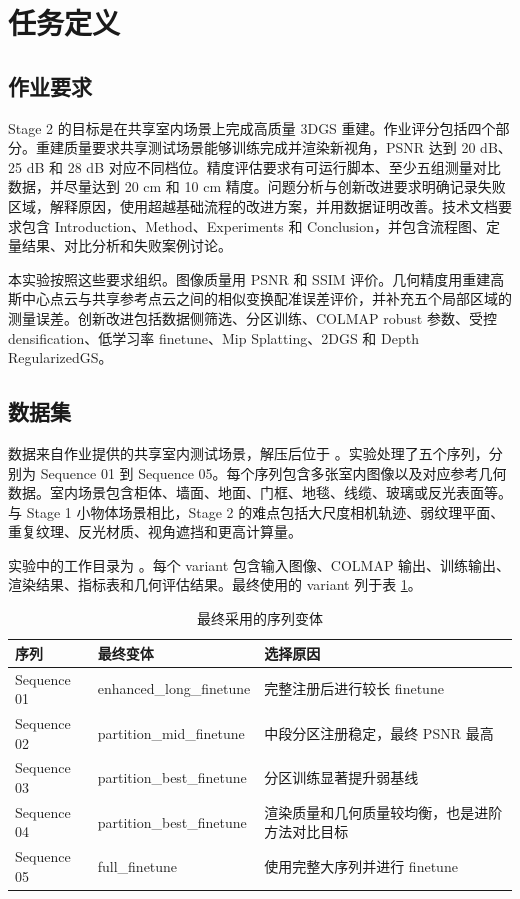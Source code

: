 \documentclass[UTF8,a4paper,11pt]{ctexart}
\newcommand{\codepath}[1]{\path{#1}}
\begin{document}
\section{任务定义}

\subsection{作业要求}

Stage 2 的目标是在共享室内场景上完成高质量 3DGS 重建。作业评分包括四个部分。重建质量要求共享测试场景能够训练完成并渲染新视角，PSNR 达到 20 dB、25 dB 和 28 dB 对应不同档位。精度评估要求有可运行脚本、至少五组测量对比数据，并尽量达到 20 cm 和 10 cm 精度。问题分析与创新改进要求明确记录失败区域，解释原因，使用超越基础流程的改进方案，并用数据证明改善。技术文档要求包含 Introduction、Method、Experiments 和 Conclusion，并包含流程图、定量结果、对比分析和失败案例讨论。

本实验按照这些要求组织。图像质量用 PSNR 和 SSIM 评价。几何精度用重建高斯中心点云与共享参考点云之间的相似变换配准误差评价，并补充五个局部区域的测量误差。创新改进包括数据侧筛选、分区训练、COLMAP robust 参数、受控 densification、低学习率 finetune、Mip Splatting、2DGS 和 Depth RegularizedGS。

\subsection{数据集}

数据来自作业提供的共享室内测试场景，解压后位于 \codepath{data}。实验处理了五个序列，分别为 Sequence 01 到 Sequence 05。每个序列包含多张室内图像以及对应参考几何数据。室内场景包含柜体、墙面、地面、门框、地毯、线缆、玻璃或反光表面等。与 Stage 1 小物体场景相比，Stage 2 的难点包括大尺度相机轨迹、弱纹理平面、重复纹理、反光材质、视角遮挡和更高计算量。

实验中的工作目录为 \codepath{work\Sequence_xx\variant_name}。每个 variant 包含输入图像、COLMAP 输出、训练输出、渲染结果、指标表和几何评估结果。最终使用的 variant 列于表 \ref{tab:final_variants}。

\begin{table}[H]
\centering
\caption{最终采用的序列变体}
\label{tab:final_variants}
\begin{tabular}{lll}
\toprule
序列 & 最终变体 & 选择原因 \\
\midrule
Sequence 01 & enhanced\_long\_finetune & 完整注册后进行较长 finetune \\
Sequence 02 & partition\_mid\_finetune & 中段分区注册稳定，最终 PSNR 最高 \\
Sequence 03 & partition\_best\_finetune & 分区训练显著提升弱基线 \\
Sequence 04 & partition\_best\_finetune & 渲染质量和几何质量较均衡，也是进阶方法对比目标 \\
Sequence 05 & full\_finetune & 使用完整大序列并进行 finetune \\
\bottomrule
\end{tabular}
\end{table}
\end{document}
